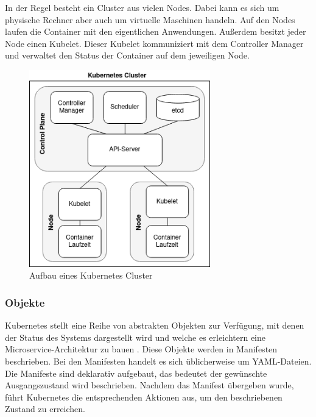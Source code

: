 In der Regel besteht ein Cluster aus vielen Nodes. Dabei kann es sich um physische Rechner aber auch um virtuelle Maschinen handeln. Auf den Nodes laufen die Container mit den eigentlichen Anwendungen. Außerdem besitzt jeder Node einen Kubelet. Dieser Kubelet kommuniziert mit dem Controller Manager und verwaltet den Status der Container auf dem jeweiligen Node.

\begin{figure}[H] 
    \centering
    \includegraphics[width=0.70\textwidth]{figures/KubernetesCluster.png}
    \caption{Aufbau eines Kubernetes Cluster}
\end{figure}

\subsubsection{Objekte}

Kubernetes stellt eine Reihe von abstrakten Objekten zur Verfügung, mit denen der Status des Systems dargestellt wird und welche es erleichtern eine Microservice-Architektur zu bauen \parencite[vgl.][S. 13]{hightowerKubernetes2018}. Diese Objekte werden in Manifesten beschrieben. Bei den Manifesten handelt es sich üblicherweise um YAML-Dateien. Die Manifeste sind deklarativ aufgebaut, das bedeutet der gewünschte Ausgangszustand wird beschrieben. Nachdem das Manifest übergeben wurde, führt Kubernetes die entsprechenden Aktionen aus, um den beschriebenen Zustand zu erreichen.

